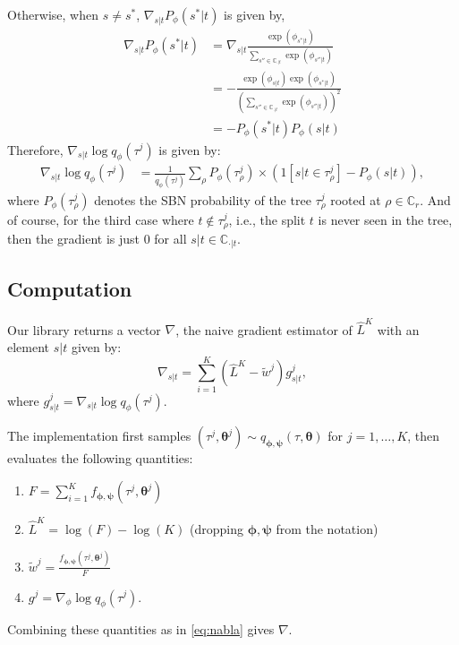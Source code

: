 \documentclass{article}
\newcommand{\bParam}{\bm{\theta}}
\begin{document}
Otherwise, when $s \not= s^*$, $\nabla_{s|t} P_{\phi}(s^*|t)$ is given by,
\begin{align*}
    \nabla_{s|t} P_{\phi}(s^*|t) &= \nabla_{s|t} \frac{\exp(\phi_{s^*|t})}{\sum\limits_{s'' \in \mathbb{C}_{.|t}} \exp(\phi_{s''|t})} \\
    &= - \frac{\exp(\phi_{s|t}) \exp(\phi_{s^*|t})}{\left(\sum\limits_{s'' \in \mathbb{C}_{.|t}} \exp(\phi_{s''|t})\right)^2} \\
    &= - P_{\phi}(s^*|t) P_{\phi}(s|t)
\end{align*}
Therefore, $\nabla_{s|t} \log q_{\phi}(\tau^j)$ is given by:
\begin{align*}
    \nabla_{s|t} \log q_{\phi}(\tau^j)
    &= \frac{1}{q_{\phi}(\tau^j)} \sum\limits_{\rho} P_{\phi}(\tau^j_{\rho}) \times \left(1[s|t \in \tau^j_{\rho}] - P_{\phi}(s|t)\right),
\end{align*}
where $P_{\phi}(\tau_{\rho}^j)$ denotes the SBN probability of the tree $\tau^j_{\rho}$ rooted at $\rho \in \mathbb{C}_r$. And of course, for the third case where $t \notin \tau_{\rho}^j$, i.e., the split $t$ is never seen in the tree, then the gradient is just $0$ for all $s | t \in \mathbb{C}_{\cdot|t}$.


\subsection*{Computation}
Our library returns a vector $\nabla$, the naive gradient estimator of $\hat{L}^K$ with an element $s|t$ given by:
\begin{equation}\label{eq:nabla}
    \nabla_{s|t} = \sum\limits_{i=1}^{K} (\hat{L}^K - \tilde{w}^j) g_{s|t}^j,
\end{equation}
where $g_{s|t}^j = \nabla_{s|t} \log q_{\phi}(\tau^j)$.

The implementation first samples $(\tau^j, \bParam^j) \sim q_{\bm{\phi}, \bm{\psi}}(\tau, \bParam)$ for $j = 1, \ldots, K$, then evaluates the following quantities:
\begin{enumerate}
    \item $F = \sum_{i=1}^{K} f_{\bm{\phi},\bm{\psi}}(\tau^j, \bParam^j)$
    \item $\hat{L}^{K} = \log(F) - \log(K)$ (dropping $\bm{\phi}, \bm{\psi}$ from the notation)
    \item $\tilde{w}^j = \frac{f_{\bm{\phi},\bm{\psi}}(\tau^j, \bParam^j)}{F}$
    \item $g^j = \nabla_{\phi} \log q_{\phi}(\tau^j)$.
\end{enumerate}
Combining these quantities as in \eqref{eq:nabla} gives $\nabla$.
\end{document}
